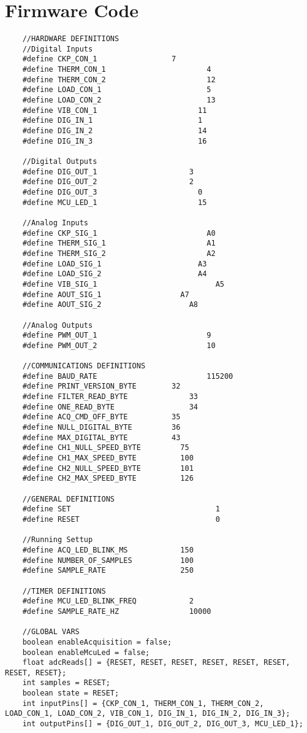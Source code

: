 \chapter{Firmware Code}\label{ch:fw-code-appendix}

  \begin{lstlisting}
    //HARDWARE DEFINITIONS
    //Digital Inputs
    #define	CKP_CON_1                 7
    #define	THERM_CON_1					      4
    #define	THERM_CON_2					      12
    #define	LOAD_CON_1					      5
    #define	LOAD_CON_2					      13
    #define	VIB_CON_1 				      	11
    #define DIG_IN_1  			    	    1
    #define DIG_IN_2   	    	     		14
    #define DIG_IN_3          				16

    //Digital Outputs
    #define DIG_OUT_1		              3
    #define	DIG_OUT_2		           	  2
    #define	DIG_OUT_3		    	      	0
    #define	MCU_LED_1          				15

    //Analog Inputs
    #define CKP_SIG_1 					      A0
    #define THERM_SIG_1					      A1
    #define THERM_SIG_2					      A2
    #define LOAD_SIG_1				      	A3
    #define LOAD_SIG_2	       				A4
    #define VIB_SIG_1					        A5
    #define AOUT_SIG_1	  	  		  	A7
    #define AOUT_SIG_2  	  		  	  A8

    //Analog Outputs
    #define	PWM_OUT_1				  	      9
    #define	PWM_OUT_2				  	      10

    //COMMUNICATIONS DEFINITIONS
    #define BAUD_RATE				  	      115200
    #define PRINT_VERSION_BYTE        32
    #define FILTER_READ_BYTE		  	  33
    #define	ONE_READ_BYTE		      	  34
    #define ACQ_CMD_OFF_BYTE          35
    #define NULL_DIGITAL_BYTE         36
    #define MAX_DIGITAL_BYTE          43
    #define CH1_NULL_SPEED_BYTE		  	75
    #define CH1_MAX_SPEED_BYTE		  	100
    #define CH2_NULL_SPEED_BYTE		  	101
    #define CH2_MAX_SPEED_BYTE		  	126

    //GENERAL DEFINITIONS
    #define SET						  	        1
    #define RESET					  	        0

    //Running Settup
    #define ACQ_LED_BLINK_MS	      	150
    #define NUMBER_OF_SAMPLES	      	100
    #define SAMPLE_RATE             	250

    //TIMER DEFINITIONS
    #define MCU_LED_BLINK_FREQ 			  2
    #define SAMPLE_RATE_HZ		  		  10000

    //GLOBAL VARS
    boolean enableAcquisition = false;
    boolean enableMcuLed = false;
    float adcReads[] = {RESET, RESET, RESET, RESET, RESET, RESET, RESET, RESET};
    int samples = RESET;
    boolean state = RESET;
    int inputPins[] = {CKP_CON_1, THERM_CON_1, THERM_CON_2, LOAD_CON_1, LOAD_CON_2, VIB_CON_1, DIG_IN_1, DIG_IN_2, DIG_IN_3};
    int outputPins[] = {DIG_OUT_1, DIG_OUT_2, DIG_OUT_3, MCU_LED_1};


\end{lstlisting}
